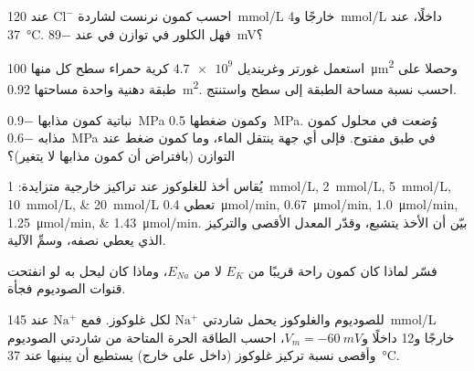 \begin{exercise}[$\star$]\label{exo:b1:membranes-transport:4}
احسب كمون نرنست لشاردة $\mathrm{Cl^-}$ عند \qty{120}{mmol/L} خارجًا
و\qty{4}{mmol/L} داخلًا، عند \qty{37}{\celsius}. فهل الكلور في توازن
في  عند \qty{-89}{mV}؟
\end{exercise}

\begin{exercise}[$\star\star$]\label{exo:b1:membranes-transport:5}
استعمل غورتر وغرينديل $\num{4.7e9}$ كرية حمراء سطح كل منها
\qty{100}{\micro m^2} وحصلا على طبقة دهنية واحدة مساحتها
\qty{0.92}{m^2}. احسب نسبة مساحة الطبقة إلى سطح  واستنتج.
\end{exercise}

\begin{exercise}[$\star\star$]\label{exo:b1:membranes-transport:6}
 نباتية كمون مذابها \qty{-0.9}{MPa} وكمون ضغطها \qty{0.5}{MPa}.
وُضعت في محلول كمون مذابه \qty{-0.6}{MPa} في طبق مفتوح. فإلى أي جهة
ينتقل الماء، وما كمون ضغط  عند التوازن (بافتراض أن كمون مذابها
لا يتغير)؟
\end{exercise}

\begin{exercise}[$\star\star$]\label{exo:b1:membranes-transport:7}
يُقاس أخذ  للغلوكوز عند تراكيز خارجية متزايدة:
\qtylist{1;2;5;10;20}{mmol/L} تعطي
\qtylist{0.4;0.67;1.0;1.25;1.43}{\micro mol/min}. بيّن أن الأخذ
يتشبع، وقدّر المعدل الأقصى والتركيز الذي يعطي نصفه، وسمِّ الآلية.
\end{exercise}

\begin{exercise}[$\star\star$]\label{exo:b1:membranes-transport:8}
فسّر لماذا كان كمون راحة  قريبًا من $E_K$ لا من $E_{Na}$، وماذا
كان ليحل به لو انفتحت قنوات الصوديوم فجأة.
\end{exercise}

\begin{exercise}[$\star\star$]\label{exo:b1:membranes-transport:9}
 للصوديوم والغلوكوز يحمل شاردتي $\mathrm{Na^+}$ لكل
غلوكوز. فمع $\mathrm{Na^+}$ عند \qty{145}{mmol/L} خارجًا و\qty{12}{}
داخلًا و$V_m = \qty{-60}{mV}$، احسب الطاقة الحرة المتاحة من شاردتي
الصوديوم وأقصى نسبة تركيز غلوكوز (داخل على خارج) يستطيع  أن
يبنيها عند \qty{37}{\celsius}.
\end{exercise}

